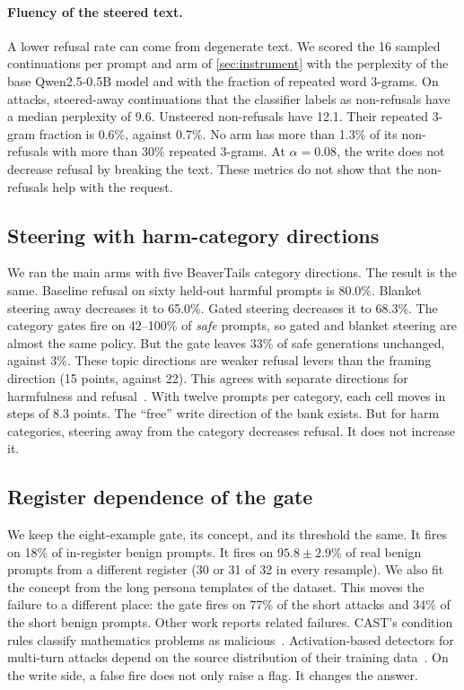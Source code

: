 \documentclass[11pt]{article}
\begin{document}
\paragraph{Fluency of the steered text.} A lower refusal rate can come from degenerate text. We scored
the 16 sampled continuations per prompt and arm of \cref{sec:instrument} with the perplexity of the base
Qwen2.5-0.5B model and with the fraction of repeated word 3-grams. On attacks, steered-away continuations that the
classifier labels as non-refusals have a median perplexity of 9.6. Unsteered non-refusals have 12.1. Their
repeated 3-gram fraction is 0.6\%, against 0.7\%. No arm has more than 1.3\% of its non-refusals with
more than 30\% repeated 3-grams. At $\alpha=0.08$, the write does not decrease refusal by breaking the text. These metrics do not show that the non-refusals help with the request.

\subsection{Steering with harm-category directions}
\label{sec:harmbank}
We ran the main arms with five BeaverTails category directions. The result is the same. Baseline refusal on
sixty held-out harmful prompts is 80.0\%. Blanket steering away decreases it to 65.0\%. Gated steering
decreases it to 68.3\%. The category gates fire on 42--100\% of \emph{safe} prompts, so gated and blanket steering are almost the same policy. But the gate leaves 33\% of safe generations unchanged, against 3\%.
These topic directions are weaker refusal levers than the framing direction (15 points, against 22). This
agrees with separate directions for harmfulness and refusal~\citep{zhao2025harmfulness}. With twelve
prompts per category, each cell moves in steps of 8.3 points. The ``free'' write direction of the bank exists. But for harm categories, steering away from the category decreases refusal. It does not increase
it.

\subsection{Register dependence of the gate}
\label{sec:register}
We keep the eight-example gate, its concept, and its threshold the same. It fires on 18\% of in-register
benign prompts. It fires on $95.8\pm2.9\%$ of real benign prompts from a different register (30 or 31 of 32
in every resample). We also fit the concept from the long persona templates of the dataset. This moves the
failure to a different place: the gate fires on 77\% of the short attacks and 34\% of the short benign
prompts. Other work reports related failures. CAST's condition rules classify mathematics problems as
malicious~\citep{sheng2025alphasteer}. Activation-based detectors for multi-turn attacks depend on the
source distribution of their training data~\citep{kulkarni2026lad}. On the write side, a false fire does
not only raise a flag. It changes the answer.
\end{document}

